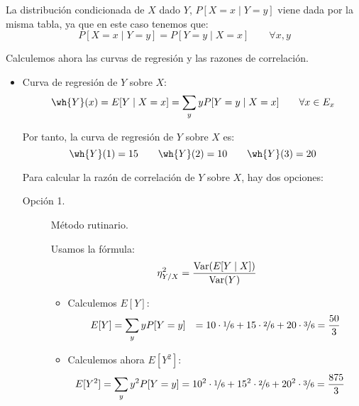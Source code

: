 \begin{ejercicio}
\begin{enumerate}
        La distribución condicionada de $X$ dado $Y$, $P[X = x\mid Y = y]$ viene dada por la misma tabla, ya que en este caso tenemos que:
        \begin{equation*}
            P[X = x\mid Y = y] = P[Y = y\mid X = x] \qquad \forall x, y
        \end{equation*}

        Calculemos ahora las curvas de regresión y las razones de correlación.
        \begin{itemize}
            \item Curva de regresión de $Y$ sobre $X$:
            \begin{equation*}
                \wh{Y}(x) = E[Y\mid X = x] = \sum_{y} y P[Y = y\mid X = x] \qquad \forall x\in E_x
            \end{equation*}
    
            Por tanto, la curva de regresión de $Y$ sobre $X$ es:
            \begin{equation*}
                \wh{Y}(1) = 15 \qquad \wh{Y}(2) = 10 \qquad \wh{Y}(3) = 20
            \end{equation*}

            Para calcular la razón de correlación de $Y$ sobre $X$,
            hay dos opciones:
            \begin{description}
                \item[Opción 1.] Método rutinario.
                
                Usamos la fórmula:
                \begin{equation*}
                    \eta^2_{Y/X} = \dfrac{\operatorname{Var}(E[Y\mid X])}{\operatorname{Var}(Y)}
                \end{equation*}
                \begin{itemize}
                    \item Calculemos $E[Y]$:
                    \begin{align*}
                        E[Y] &= \sum_{y} y P[Y = y]
                        &= 10 \cdot \nicefrac{1}{6} + 15 \cdot \nicefrac{2}{6} + 20 \cdot \nicefrac{3}{6}
                        = \frac{50}{3}
                    \end{align*}

                    \item Calculemos ahora $E[Y^2]$:
                    \begin{align*}
                        E[Y^2] &= \sum_{y} y^2 P[Y = y]
                        = 10^2 \cdot \nicefrac{1}{6} + 15^2 \cdot \nicefrac{2}{6} + 20^2 \cdot \nicefrac{3}{6}
                        = \frac{875}{3}
                    \end{align*}


\end{itemize}
\end{description}
\end{itemize}
\end{enumerate}
\end{ejercicio}
